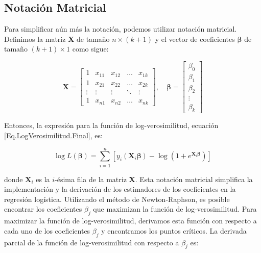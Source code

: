 \documentclass[a4paper]{report} %
\begin{document}
\subsection{Notaci\'on Matricial}

Para simplificar a\'un m\'as la notaci\'on, podemos utilizar notaci\'on matricial. Definimos la matriz $\mathbf{X}$ de tama\~no $n \times (k+1)$ y el vector de coeficientes $\boldsymbol{\beta}$ de tama\~no $(k+1) \times 1$ como sigue:

\begin{equation}\label{Eq.Matricial1}
\mathbf{X} = \begin{bmatrix}
1 & x_{11} & x_{12} & \ldots & x_{1k} \\
1 & x_{21} & x_{22} & \ldots & x_{2k} \\
\vdots & \vdots & \vdots & \ddots & \vdots \\
1 & x_{n1} & x_{n2} & \ldots & x_{nk}
\end{bmatrix}, \quad
\boldsymbol{\beta} = \begin{bmatrix}
\beta_0 \\
\beta_1 \\
\beta_2 \\
\vdots \\
\beta_k
\end{bmatrix}
\end{equation}

Entonces, la expresi\'on para la funci\'on de log-verosimilitud, ecuaci\'on \ref{Eq.LogVerosimilitud.Final}, es:

\begin{equation}\label{Eq.LogLikelihood1.Matricial}
\log L(\boldsymbol{\beta}) = \sum_{i=1}^{n} \left[ y_i (\mathbf{X}_i \boldsymbol{\beta}) - \log(1 + e^{\mathbf{X}_i \boldsymbol{\beta}}) \right]
\end{equation}

donde $\mathbf{X}_i$ es la $i$-\'esima fila de la matriz $\mathbf{X}$.  Esta notaci\'on matricial simplifica la implementaci\'on y la derivaci\'on de los estimadores de los coeficientes en la regresi\'on log\'istica. Utilizando el  m\'etodo de Newton-Raphson, es posible encontrar los coeficientes $\beta_j$ que maximizan la funci\'on de log-verosimilitud. Para maximizar la funci\'on de log-verosimilitud, derivamos esta funci\'on con respecto a cada uno de los coeficientes $\beta_j$ y encontramos los puntos cr\'iticos. La derivada parcial de la funci\'on de log-verosimilitud con respecto a $\beta_j$ es:
\end{document}
